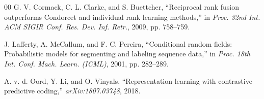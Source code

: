 \documentclass[conference]{IEEEtran}
\begin{document}
\begin{thebibliography}{00}
G. V. Cormack, C. L. Clarke, and S. Buettcher, ``Reciprocal rank fusion outperforms Condorcet and individual rank learning methods,'' in \textit{Proc. 32nd Int. ACM SIGIR Conf. Res. Dev. Inf. Retr.}, 2009, pp. 758--759.

J. Lafferty, A. McCallum, and F. C. Pereira, ``Conditional random fields: Probabilistic models for segmenting and labeling sequence data,'' in \textit{Proc. 18th Int. Conf. Mach. Learn. (ICML)}, 2001, pp. 282--289.

A. v. d. Oord, Y. Li, and O. Vinyals, ``Representation learning with contrastive predictive coding,'' \textit{arXiv:1807.03748}, 2018.

\end{thebibliography}
\end{document}
